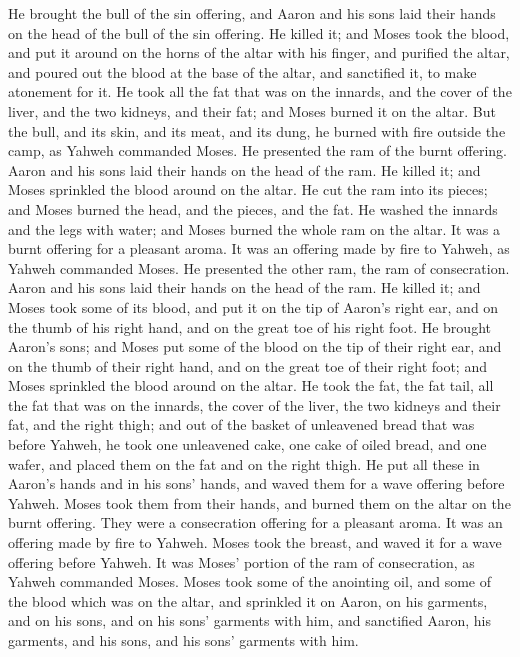  He brought the bull of the sin offering, and Aaron and
his sons laid their hands on the head of the bull of the sin offering.
 He killed it; and Moses took the blood, and put it
around on the horns of the altar with his finger, and purified the
altar, and poured out the blood at the base of the altar, and sanctified
it, to make atonement for it.  He took all the fat that
was on the innards, and the cover of the liver, and the two kidneys, and
their fat; and Moses burned it on the altar.  But the
bull, and its skin, and its meat, and its dung, he burned with fire
outside the camp, as Yahweh commanded Moses.  He
presented the ram of the burnt offering. Aaron and his sons laid their
hands on the head of the ram.  He killed it; and Moses
sprinkled the blood around on the altar.  He cut the ram
into its pieces; and Moses burned the head, and the pieces, and the fat.
 He washed the innards and the legs with water; and Moses
burned the whole ram on the altar. It was a burnt offering for a
pleasant aroma. It was an offering made by fire to Yahweh, as Yahweh
commanded Moses.  He presented the other ram, the ram of
consecration. Aaron and his sons laid their hands on the head of the
ram.  He killed it; and Moses took some of its blood, and
put it on the tip of Aaron's right ear, and on the thumb of his right
hand, and on the great toe of his right foot.  He brought
Aaron's sons; and Moses put some of the blood on the tip of their right
ear, and on the thumb of their right hand, and on the great toe of their
right foot; and Moses sprinkled the blood around on the altar.
 He took the fat, the fat tail, all the fat that was on
the innards, the cover of the liver, the two kidneys and their fat, and
the right thigh;  and out of the basket of unleavened
bread that was before Yahweh, he took one unleavened cake, one cake of
oiled bread, and one wafer, and placed them on the fat and on the right
thigh.  He put all these in Aaron's hands and in his
sons' hands, and waved them for a wave offering before Yahweh.
 Moses took them from their hands, and burned them on the
altar on the burnt offering. They were a consecration offering for a
pleasant aroma. It was an offering made by fire to Yahweh.
 Moses took the breast, and waved it for a wave offering
before Yahweh. It was Moses' portion of the ram of consecration, as
Yahweh commanded Moses.  Moses took some of the anointing
oil, and some of the blood which was on the altar, and sprinkled it on
Aaron, on his garments, and on his sons, and on his sons' garments with
him, and sanctified Aaron, his garments, and his sons, and his sons'
garments with him.

